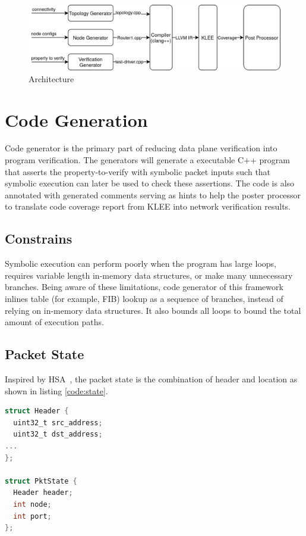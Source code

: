 \documentclass[letterpaper, 10 pt, conference]{ieeeconf}  %
\begin{document}
\begin{figure}[]
  \centering
  \includegraphics[width=\linewidth]{overview.png}
  \caption{Architecture}
  \label{fig:arch}
\end{figure}

\section{Code Generation}\label{sec:codegen}
Code generator is the primary part of reducing data plane verification into program verification. The generators will generate a  executable C++ program that asserts the property-to-verify with symbolic packet inputs such that symbolic execution can later be used to check these assertions. The code is also annotated with generated comments serving as hints to help the poster processor to translate code coverage report from KLEE into network verification results.
\subsection{Constrains}
Symbolic execution can perform poorly when the program has large loops, requires variable length in-memory data structures, or make many unnecessary branches. Being aware of these limitations, code generator of this framework inlines table (for example, FIB) lookup as a sequence of branches, instead of relying on in-memory data structures. It also bounds all loops to bound the total amount of execution paths. 

\subsection{Packet State}
Inspired by HSA~\cite{hsa}, the packet state is the combination of header and location as shown in listing \ref{code:state}.
\begin{lstlisting}[language=C,caption=Packet State,label=code:state,captionpos=b]
struct Header {
  uint32_t src_address;
  uint32_t dst_address;
...
};

struct PktState {
  Header header;
  int node;
  int port;
};
\end{lstlisting}
\end{document}
